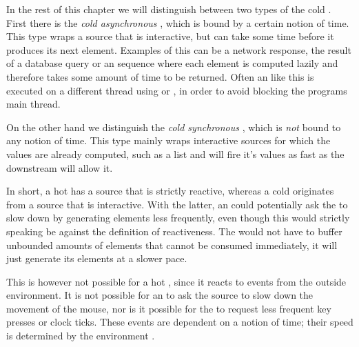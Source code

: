 In the rest of this chapter we will distinguish between two types of the cold \obs. First there is the \textit{cold asynchronous \obs}, which is bound by a certain notion of time. This type wraps a source that is interactive, but can take some time before it produces its next element. Examples of this can be a network response, the result of a database query or an \ieb sequence where each element is computed lazily and therefore takes some amount of time to be returned. Often an \obs like this is executed on a different thread using  or , in order to avoid blocking the programs main thread.

On the other hand we distinguish the \textit{cold synchronous \obs}, which is \emph{not} bound to any notion of time. This type mainly wraps interactive sources for which the values are already computed, such as a list and will fire it's values as fast as the downstream will allow it.

In short, a hot \obs has a source that is strictly reactive, whereas a cold \obs originates from a source that is interactive. With the latter, an \obv could potentially ask the \obs to slow down by generating elements less frequently, even though this would strictly speaking be against the definition of reactiveness. The \obs would not have to buffer unbounded amounts of elements that cannot be consumed immediately, it will just generate its elements at a slower pace.

This is however not possible for a hot \obs, since it reacts to events from the outside environment. It is not possible for an \obv to ask the source to slow down the movement of the mouse, nor is it possible for the \obv to request less frequent key presses or clock ticks. These events are dependent on a notion of time; their speed is determined by the environment \cite{berry1991-Reactive}.
